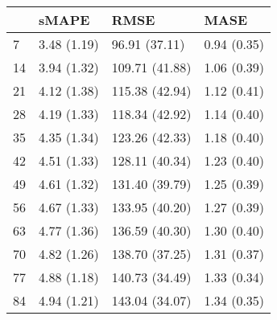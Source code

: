 \begin{tabular}{llll}
\toprule
{} &        sMAPE &            RMSE &         MASE \\
\midrule
7  &  3.48 (1.19) &   96.91 (37.11) &  0.94 (0.35) \\
14 &  3.94 (1.32) &  109.71 (41.88) &  1.06 (0.39) \\
21 &  4.12 (1.38) &  115.38 (42.94) &  1.12 (0.41) \\
28 &  4.19 (1.33) &  118.34 (42.92) &  1.14 (0.40) \\
35 &  4.35 (1.34) &  123.26 (42.33) &  1.18 (0.40) \\
42 &  4.51 (1.33) &  128.11 (40.34) &  1.23 (0.40) \\
49 &  4.61 (1.32) &  131.40 (39.79) &  1.25 (0.39) \\
56 &  4.67 (1.33) &  133.95 (40.20) &  1.27 (0.39) \\
63 &  4.77 (1.36) &  136.59 (40.30) &  1.30 (0.40) \\
70 &  4.82 (1.26) &  138.70 (37.25) &  1.31 (0.37) \\
77 &  4.88 (1.18) &  140.73 (34.49) &  1.33 (0.34) \\
84 &  4.94 (1.21) &  143.04 (34.07) &  1.34 (0.35) \\
\bottomrule
\end{tabular}
